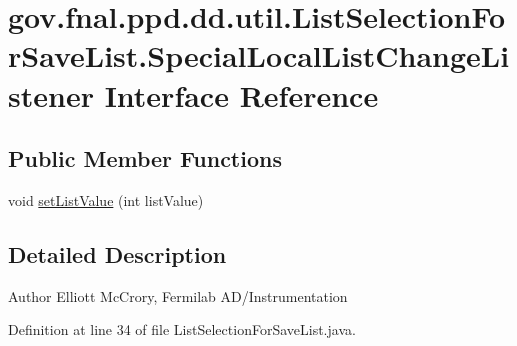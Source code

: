 \hypertarget{interfacegov_1_1fnal_1_1ppd_1_1dd_1_1util_1_1ListSelectionForSaveList_1_1SpecialLocalListChangeListener}{\section{gov.\-fnal.\-ppd.\-dd.\-util.\-List\-Selection\-For\-Save\-List.\-Special\-Local\-List\-Change\-Listener Interface Reference}
\label{interfacegov_1_1fnal_1_1ppd_1_1dd_1_1util_1_1ListSelectionForSaveList_1_1SpecialLocalListChangeListener}
}
\subsection*{Public Member Functions}
\begin{DoxyCompactItemize}
\item 
void \hyperlink{interfacegov_1_1fnal_1_1ppd_1_1dd_1_1util_1_1ListSelectionForSaveList_1_1SpecialLocalListChangeListener_ac2159c66129a09566f089e48b6c4c462}{set\-List\-Value} (int list\-Value)
\end{DoxyCompactItemize}


\subsection{Detailed Description}
\begin{DoxyAuthor}{Author}
Elliott Mc\-Crory, Fermilab A\-D/\-Instrumentation 
\end{DoxyAuthor}


Definition at line 34 of file List\-Selection\-For\-Save\-List.\-java.



